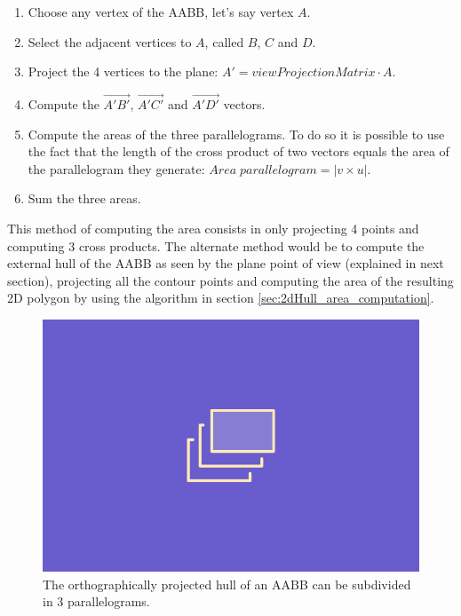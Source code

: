 \documentclass{PoliMi_MasterThesis}
\begin{document}
\begin{enumerate}
	\item Choose any vertex of the AABB, let's say vertex $A$.
	\item Select the adjacent vertices to $A$, called $B$, $C$ and $D$.
	\item Project the 4 vertices to the plane: $A' = viewProjectionMatrix \cdot A$.
	\item Compute the $\overrightarrow{A'B'}$, $\overrightarrow{A'C'}$ and $\overrightarrow{A'D'}$ vectors.
	\item Compute the areas of the three parallelograms. To do so it is possible to use the fact that the length of the cross product of two vectors equals the area of the parallelogram they generate: $Area\; parallelogram = |v \times u|$.
	\item Sum the three areas.
\end{enumerate}

This method of computing the area consists in only projecting 4 points and computing 3 cross products. The alternate method would be to compute the external hull of the AABB as seen by the plane point of view (explained in next section), projecting all the contour points and computing the area of the resulting 2D polygon by using the algorithm in section \ref{sec:2dHull_area_computation}.

\begin{figure}[H]
    \centering
    \includegraphics[width=\textwidth*\real{0.6}]{Images/TODO.png}
    \caption{The orthographically projected hull of an AABB can be subdivided in 3 parallelograms.}
    \label{fig:aabb_parallelograms}
\end{figure}
\end{document}
